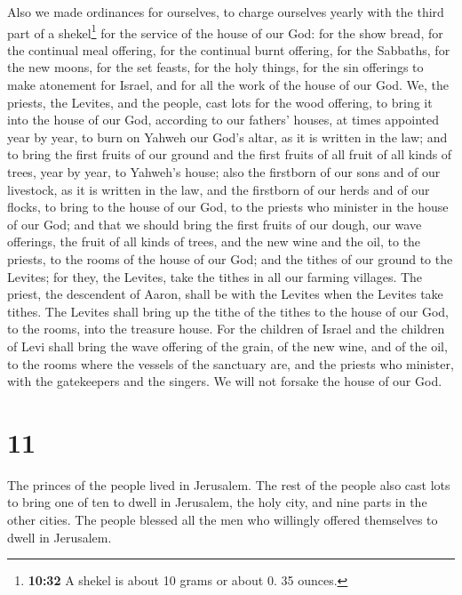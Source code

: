  Also we made ordinances for ourselves, to charge
ourselves yearly with the third part of a shekel\footnote{\textbf{10:32}
  A shekel is about 10 grams or about 0. 35 ounces.} for the service of
the house of our God:  for the show bread, for the
continual meal offering, for the continual burnt offering, for the
Sabbaths, for the new moons, for the set feasts, for the holy things,
for the sin offerings to make atonement for Israel, and for all the work
of the house of our God.  We, the priests, the Levites,
and the people, cast lots for the wood offering, to bring it into the
house of our God, according to our fathers' houses, at times appointed
year by year, to burn on Yahweh our God's altar, as it is written in the
law;  and to bring the first fruits of our ground and the
first fruits of all fruit of all kinds of trees, year by year, to
Yahweh's house;  also the firstborn of our sons and of
our livestock, as it is written in the law, and the firstborn of our
herds and of our flocks, to bring to the house of our God, to the
priests who minister in the house of our God;  and that
we should bring the first fruits of our dough, our wave offerings, the
fruit of all kinds of trees, and the new wine and the oil, to the
priests, to the rooms of the house of our God; and the tithes of our
ground to the Levites; for they, the Levites, take the tithes in all our
farming villages.  The priest, the descendent of Aaron,
shall be with the Levites when the Levites take tithes. The Levites
shall bring up the tithe of the tithes to the house of our God, to the
rooms, into the treasure house.  For the children of
Israel and the children of Levi shall bring the wave offering of the
grain, of the new wine, and of the oil, to the rooms where the vessels
of the sanctuary are, and the priests who minister, with the gatekeepers
and the singers. We will not forsake the house of our God.

\hypertarget{section-10}{%
\section{11}\label{section-10}}

 The princes of the people lived in Jerusalem. The rest of
the people also cast lots to bring one of ten to dwell in Jerusalem, the
holy city, and nine parts in the other cities.  The people
blessed all the men who willingly offered themselves to dwell in
Jerusalem.

